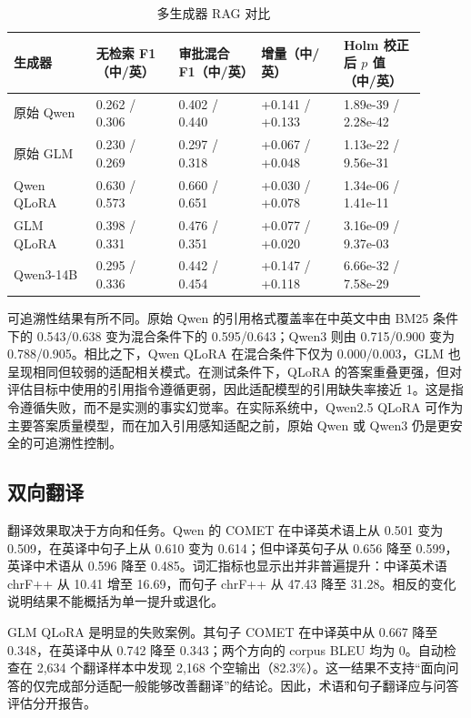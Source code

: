 \begin{table}[ht]
\centering
\caption{多生成器 RAG 对比}
\begin{tabular}{p{0.18\linewidth}p{0.18\linewidth}p{0.18\linewidth}p{0.18\linewidth}p{0.18\linewidth}}
\toprule
生成器 & 无检索 F1（中/英） & 审批混合 F1（中/英） & 增量（中/英） & Holm 校正后 $p$ 值（中/英） \\
\midrule
原始 Qwen & 0.262 / 0.306 & 0.402 / 0.440 & +0.141 / +0.133 & 1.89e-39 / 2.28e-42 \\
原始 GLM & 0.230 / 0.269 & 0.297 / 0.318 & +0.067 / +0.048 & 1.13e-22 / 9.56e-31 \\
Qwen QLoRA & 0.630 / 0.573 & 0.660 / 0.651 & +0.030 / +0.078 & 1.34e-06 / 1.41e-11 \\
GLM QLoRA & 0.398 / 0.331 & 0.476 / 0.351 & +0.077 / +0.020 & 3.16e-09 / 9.37e-03 \\
Qwen3-14B & 0.295 / 0.336 & 0.442 / 0.454 & +0.147 / +0.118 & 6.66e-32 / 7.58e-29 \\
\bottomrule
\end{tabular}
\end{table}

可追溯性结果有所不同。原始 Qwen 的引用格式覆盖率在中英文中由 BM25 条件下的 0.543/0.638 变为混合条件下的 0.595/0.643；Qwen3 则由 0.715/0.900 变为 0.788/0.905。相比之下，Qwen QLoRA 在混合条件下仅为 0.000/0.003，GLM 也呈现相同但较弱的适配相关模式。在测试条件下，QLoRA 的答案重叠更强，但对评估目标中使用的引用指令遵循更弱，因此适配模型的引用缺失率接近 1。这是指令遵循失败，而不是实测的事实幻觉率。在实际系统中，Qwen2.5 QLoRA 可作为主要答案质量模型，而在加入引用感知适配之前，原始 Qwen 或 Qwen3 仍是更安全的可追溯性控制。

\subsection{双向翻译}

翻译效果取决于方向和任务。Qwen 的 COMET 在中译英术语上从 0.501 变为 0.509，在英译中句子上从 0.610 变为 0.614；但中译英句子从 0.656 降至 0.599，英译中术语从 0.596 降至 0.485。词汇指标也显示出并非普遍提升：中译英术语 chrF++ 从 10.41 增至 16.69，而句子 chrF++ 从 47.43 降至 31.28。相反的变化说明结果不能概括为单一提升或退化。

GLM QLoRA 是明显的失败案例。其句子 COMET 在中译英中从 0.667 降至 0.348，在英译中从 0.742 降至 0.343；两个方向的 corpus BLEU 均为 0。自动检查在 2,634 个翻译样本中发现 2,168 个空输出（82.3\%）。这一结果不支持“面向问答的仅完成部分适配一般能够改善翻译”的结论。因此，术语和句子翻译应与问答评估分开报告。

